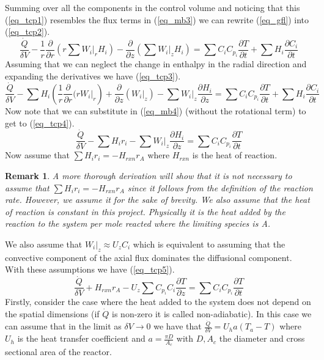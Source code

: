 \documentclass[11pt,fleqn]{article}
\theoremstyle{defstyle}
\newtheorem{rmrk}{Remark}[section]
\begin{document}
Summing over all the components in the control volume and noticing that this (\ref{eq_tcp1}) resembles the flux terms in (\ref{eq_mb3}) we can rewrite (\ref{eq_gfl}) into (\ref{eq_tcp2}).
\begin{equation}
\frac{\dot{Q}}{\delta V} - \frac{1}{r}\frac{\partial}{\partial r}\left(r\sum W_i|_r H_i\right) - \frac{\partial}{\partial z}\left(\sum W_i|_z H_i\right) =\sum C_i C_{p_i} \frac{\partial T}{\partial t} + \sum H_i \frac{\partial C_i}{\partial t}
\label{eq_tcp2}
\end{equation}
Assuming that we can neglect the change in enthalpy in the radial direction and expanding the derivatives we have (\ref{eq_tcp3}).
\begin{equation}
\frac{\dot{Q}}{\delta V} - \sum H_i \left(\frac{1}{r}\frac{\partial}{\partial r}(r W_i|_r\right)+\frac{\partial}{\partial z}\left(W_i|_z\right) - \sum W_i|_z \frac{\partial H_i}{\partial z} =\sum C_i C_{p_i} \frac{\partial T}{\partial t} + \sum H_i \frac{\partial C_i}{\partial t}
\label{eq_tcp3}
\end{equation}
Now note that we can substitute in (\ref{eq_mb4}) (without the rotational term) to get to (\ref{eq_tcp4}).
\begin{equation}
\frac{\dot{Q}}{\delta V} - \sum H_i r_i - \sum W_i|_z \frac{\partial H_i}{\partial z} =\sum C_i C_{p_i} \frac{\partial T}{\partial t}
\label{eq_tcp4}
\end{equation}
Now assume that $\sum H_i r_i = -H_{rxn}r_A$ where $H_{rxn}$ is the heat of reaction.
\begin{rmrk}
A more thorough derivation will show that it is not necessary to assume that $\sum H_i r_i = -H_{rxn}r_A$ since it follows from the definition of the reaction rate. However, we assume it for the sake of brevity. We also assume that the heat of reaction is constant in this project. Physically it is the heat added by the reaction to the system per mole reacted where the limiting species is A.
\end{rmrk}
We also assume that $W_i|_z \approx U_z C_i$ which is equivalent to assuming that the convective component of the axial flux dominates the diffusional component. With these assumptions we have (\ref{eq_tcp5}).
\begin{equation}
\frac{\dot{Q}}{\delta V} + H_{rxn}r_A - U_z\sum C_{p_i}C_i \frac{\partial T}{\partial z} =\sum C_i C_{p_i} \frac{\partial T}{\partial t}
\label{eq_tcp5}
\end{equation}
Firstly, consider the case where the heat added to the system does not depend on the spatial dimensions (if $\dot{Q}$ is non-zero it is called non-adiabatic). In this case we can assume that in the limit as $\delta V \rightarrow 0 $ we have that $\frac{\dot{Q}}{\delta V} = U_ha(T_a-T)$ where $U_h$ is the heat transfer coefficient and $a = \frac{\pi D}{A_c}$ with $D, A_c$ the diameter and cross sectional area of the reactor.
\end{document}
